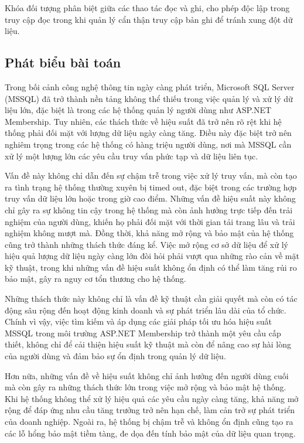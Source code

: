 \documentclass{article}[14pt]
\begin{document}
{{Khóa đối tượng phân biệt giữa các thao tác đọc và ghi, cho phép độc lập trong
truy cập đọc trong khi quản lý cẩn thận truy cập bản ghi để tránh xung đột dữ
liệu.


\subsection{Phát biểu bài toán}

Trong bối cảnh công nghệ thông tin ngày càng phát triển, Microsoft SQL Server (MSSQL) đã trở thành nền tảng không thể thiếu trong việc quản lý và xử lý dữ liệu lớn, đặc biệt là trong các hệ thống quản lý người dùng như ASP.NET Membership. Tuy nhiên, các thách thức về hiệu suất đã trở nên rõ rệt khi hệ thống phải đối mặt với lượng dữ liệu ngày càng tăng. Điều này đặc biệt trở nên nghiêm trọng trong các hệ thống có hàng triệu người dùng, nơi mà MSSQL cần xử lý một lượng lớn các yêu cầu truy vấn phức tạp và dữ liệu liên tục.

Vấn đề này không chỉ dẫn đến sự chậm trễ trong việc xử lý truy vấn, mà còn tạo ra tình trạng hệ thống thường xuyên bị timed out, đặc biệt trong các trường hợp truy vấn dữ liệu lớn hoặc trong giờ cao điểm. Những vấn đề hiệu suất này không chỉ gây ra sự không tin cậy trong hệ thống mà còn ảnh hưởng trực tiếp đến trải nghiệm của người dùng, khiến họ phải đối mặt với thời gian tải trang lâu và trải nghiệm không mượt mà. Đồng thời, khả năng mở rộng và bảo mật của hệ thống cũng trở thành những thách thức đáng kể. Việc mở rộng cơ sở dữ liệu để xử lý hiệu quả lượng dữ liệu ngày càng lớn đòi hỏi phải vượt qua những rào cản về mặt kỹ thuật, trong khi những vấn đề hiệu suất không ổn định có thể làm tăng rủi ro bảo mật, gây ra nguy cơ tổn thương cho hệ thống.

Những thách thức này không chỉ là vấn đề kỹ thuật cần giải quyết mà còn có tác động sâu rộng đến hoạt động kinh doanh và sự phát triển lâu dài của tổ chức. Chính vì vậy, việc tìm kiếm và áp dụng các giải pháp tối ưu hóa hiệu suất MSSQL trong môi trường ASP.NET Membership trở thành một yêu cầu cấp thiết, không chỉ để cải thiện hiệu suất kỹ thuật mà còn để nâng cao sự hài lòng của người dùng và đảm bảo sự ổn định trong quản lý dữ liệu.


Hơn nữa, những vấn đề về hiệu suất không chỉ ảnh hưởng đến người dùng cuối mà còn gây ra những thách thức lớn trong việc mở rộng và bảo mật hệ thống. Khi hệ thống không thể xử lý hiệu quả các yêu cầu ngày càng tăng, khả năng mở rộng để đáp ứng nhu cầu tăng trưởng trở nên hạn chế, làm cản trở sự phát triển của doanh nghiệp. Ngoài ra, hệ thống bị chậm trễ và không ổn định cũng tạo ra các lỗ hổng bảo mật tiềm tàng, đe dọa đến tính bảo mật của dữ liệu quan trọng.


}}
\end{document}
